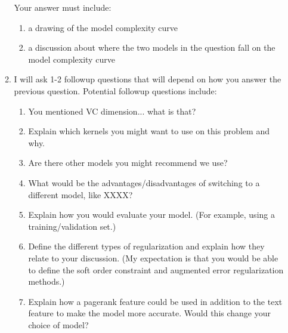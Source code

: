 \documentclass[10pt]{exam}
\theoremstyle{definition}
\begin{document}
\begin{enumerate}
\begin{enumerate}
Your answer must include:
        \begin{enumerate}
            \item a drawing of the model complexity curve
            \item a discussion about where the two models in the question fall on the model complexity curve
        \end{enumerate}

\item
    I will ask 1-2 followup questions that will depend on how you answer the previous question.
    Potential followup questions include:
    \begin{enumerate}
        \item You mentioned VC dimension... what is that?
        \item Explain which kernels you might want to use on this problem and why.
        \item Are there other models you might recommend we use?
        \item What would be the advantages/disadvantages of switching to a different model, like XXXX?
        \item Explain how you would evaluate your model.  (For example, using a training/validation set.)
        \item Define the different types of regularization and explain how they relate to your discussion.  (My expectation is that you would be able to define the soft order constraint and augmented error regularization methods.) 
        \item Explain how a pagerank feature could be used in addition to the text feature to make the model more accurate.
            Would this change your choice of model?
    \end{enumerate}
    \end{enumerate}
\end{enumerate}
\end{document}
